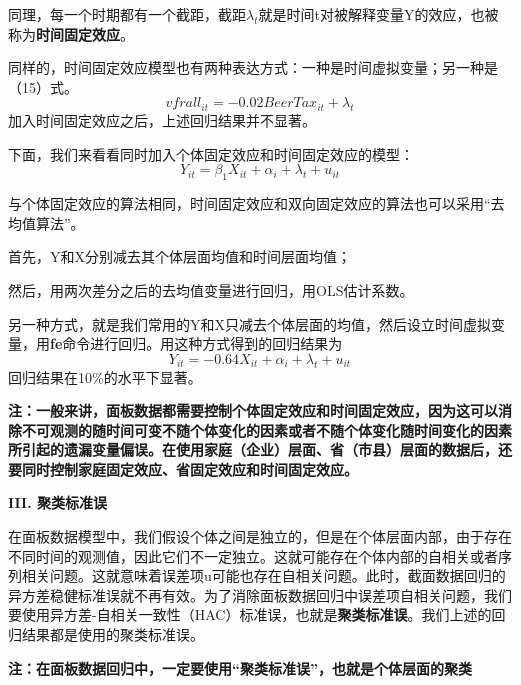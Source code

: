 \documentclass[cn,10pt,math=newtx,citestyle=gb7714-2015,bibstyle=gb7714-2015]{elegantbook}
\begin{document}
同理，每一个时期都有一个截距，截距$\lambda_t$就是时间t对被解释变量Y的效应，也被称为\textbf{时间固定效应}。

同样的，时间固定效应模型也有两种表达方式：一种是时间虚拟变量；另一种是（15）式。
\begin{equation}
	vfrall_{it}=-0.02BeerTax_{it}+\lambda_t
\end{equation}
加入时间固定效应之后，上述回归结果并不显著。

下面，我们来看看同时加入个体固定效应和时间固定效应的模型：
\begin{equation}
	Y_{it}=\beta_{1}X_{it}+\alpha_i+\lambda_t+u_{it}
\end{equation}

与个体固定效应的算法相同，时间固定效应和双向固定效应的算法也可以采用“去均值算法”。

首先，Y和X分别减去其个体层面均值和时间层面均值；

然后，用两次差分之后的去均值变量进行回归，用OLS估计系数。

另一种方式，就是我们常用的Y和X只减去个体层面的均值，然后设立时间虚拟变量，用\textbf{fe}命令进行回归。用这种方式得到的回归结果为
\begin{equation}
	Y_{it}=-0.64X_{it}+\alpha_i+\lambda_t+u_{it}
\end{equation}
回归结果在10\%的水平下显著。

\textbf{注：一般来讲，面板数据都需要控制个体固定效应和时间固定效应，因为这可以消除不可观测的随时间可变不随个体变化的因素或者不随个体变化随时间变化的因素所引起的遗漏变量偏误。在使用家庭（企业）层面、省（市县）层面的数据后，还要同时控制家庭固定效应、省固定效应和时间固定效应。}

\textbf{III. 聚类标准误}

在面板数据模型中，我们假设个体之间是独立的，但是在个体层面内部，由于存在不同时间的观测值，因此它们不一定独立。这就可能存在个体内部的自相关或者序列相关问题。这就意味着误差项u可能也存在自相关问题。此时，截面数据回归的异方差稳健标准误就不再有效。为了消除面板数据回归中误差项自相关问题，我们要使用异方差-自相关一致性（HAC）标准误，也就是\textbf{聚类标准误}。我们上述的回归结果都是使用的聚类标准误。

\textbf{注：在面板数据回归中，一定要使用“聚类标准误”，也就是个体层面的聚类}
\end{document}
